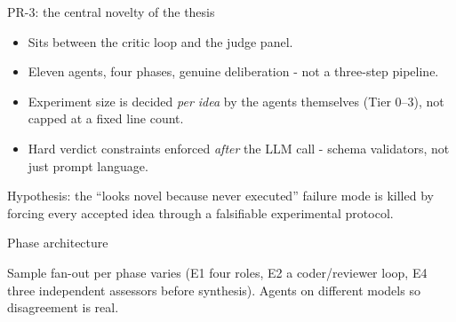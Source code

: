 \documentclass[10pt,aspectratio=169]{beamer}
\newcommand{\agent}[1]{\textcolor{accent}{\textbf{#1}}}
\begin{document}
\begin{frame}{PR-3: the central novelty of the thesis}
  \begin{itemize}
    \item Sits between the critic loop and the judge panel.
    \item Eleven agents, four phases, genuine deliberation -
      not a three-step pipeline.
    \item Experiment size is decided \emph{per idea} by the agents themselves
      (Tier 0--3), not capped at a fixed line count.
    \item Hard verdict constraints enforced \emph{after} the LLM call -
      schema validators, not just prompt language.
  \end{itemize}

  \vspace{0.5em}
  \alert{Hypothesis:} the ``looks novel because never executed'' failure
  mode is killed by forcing every accepted idea through a falsifiable
  experimental protocol.
\end{frame}

\begin{frame}{Phase architecture}
  \centering
  \scriptsize

  \vspace{0.7em}
  \footnotesize
  Sample fan-out per phase varies (E1 four roles, E2 a coder/reviewer loop, E4 three independent assessors before synthesis).
  Agents on different models so disagreement is real.
\end{frame}
\end{document}
